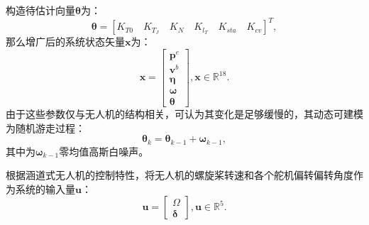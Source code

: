 构造待估计向量$\bm{\theta}$为：
\begin{equation}
    \bm{\theta} = [
        K_{T0} \quad K_{T_J} \quad K_{N} \quad K_{l_T} \quad K_{sta} \quad K_{cv}]^T,
\end{equation}
那么增广后的系统状态矢量$\bm{x}$为：
\begin{equation}
    \bm{x} = 
    \begin{bmatrix}
        \bm{p}^e \\
        \bm{v}^b \\
        \bm{\eta} \\
        \bm{\omega} \\
        \bm{\theta}
    \end{bmatrix},
    \bm{x} \in \mathbb{R}^{18}.
\end{equation}
由于这些参数仅与无人机的结构相关，可认为其变化是足够缓慢的，其动态可建模为随机游走过程：
\begin{equation}
    \bm{\theta}_{k} = \bm{\theta}_{k-1} + \bm{\omega}_{k-1},
\end{equation}
其中为$\bm{\omega}_{k-1}$零均值高斯白噪声。

根据涵道式无人机的控制特性，将无人机的螺旋桨转速和各个舵机偏转偏转角度作为系统的输入量$\bm{u}$：
\begin{equation}
    \bm{u} = 
    \begin{bmatrix}
        \Omega \\
        \bm{\delta}
    \end{bmatrix},
    \bm{u} \in \mathbb{R}^{5}.
\end{equation}

